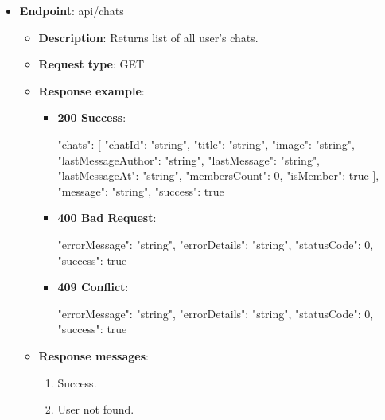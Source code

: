 \begin{itemize}
    \item \textbf{Endpoint}: api/chats
    \begin{itemize}
        \item \textbf{Description}: Returns list of all user's chats.
        \item \textbf{Request type}: GET
        \item \textbf{Response example}:
        \begin{itemize}
            \item \textbf{200 Success}:
            \begin{spverbatim}
            {
                "chats": [
                    {
                        "chatId": "string",
                        "title": "string",
                        "image": "string",
                        "lastMessageAuthor": "string",
                        "lastMessage": "string",
                        "lastMessageAt": "string",
                        "membersCount": 0,
                        "isMember": true
                    }
                ],
                "message": "string",
                "success": true
            }
            \end{spverbatim}
            \item \textbf{400 Bad Request}:
            \begin{spverbatim}
            {
                "errorMessage": "string",
                "errorDetails": "string",
                "statusCode": 0,
                "success": true
            }
            \end{spverbatim}
            \item \textbf{409 Conflict}:
            \begin{spverbatim}
            {
                "errorMessage": "string",
                "errorDetails": "string",
                "statusCode": 0,
                "success": true
            }
            \end{spverbatim}
        \end{itemize}
        \item \textbf{Response messages}:
        \begin{enumerate}
            \item Success.
            \item User not found.
        \end{enumerate}
    \end{itemize}


\end{itemize}
